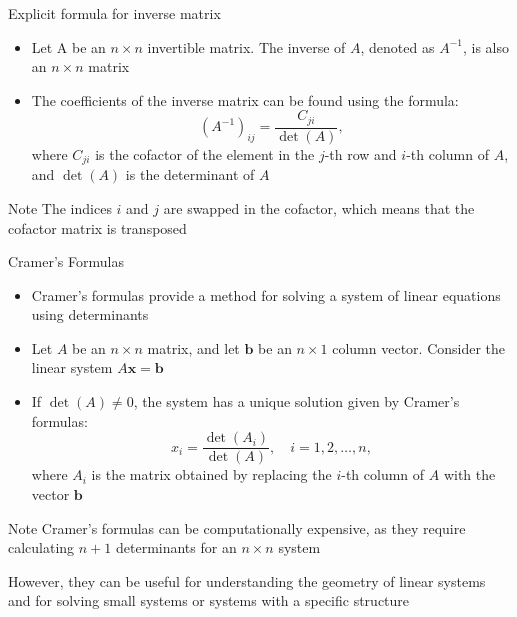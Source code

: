 \documentclass[fullscreen=true, bookmarks=true, hyperref={pdfencoding=unicode}]{beamer}
\begin{document}
\begin{frame}{Explicit formula for inverse matrix}
  \begin{itemize}
    \item Let A be an $n \times n$ invertible matrix. The inverse of $A$, 
    denoted as $A^{-1}$, is also an $n \times n$ matrix
    \item The coefficients of the inverse matrix can be found using the formula:
      \[
      (A^{-1})_{ij} = \frac{C_{ji}}{\det(A)},
      \]
      where $C_{ji}$ is the cofactor of the element in the $j$-th row 
      and $i$-th column of $A$, and $\det(A)$ is the determinant of $A$
  \end{itemize}

  \pause
  \begin{block}{Note}
    The indices $i$ and $j$ are swapped in the cofactor, 
    which means that the cofactor matrix is transposed
  \end{block}

\end{frame}


\begin{frame}{Cramer's Formulas}
  \begin{itemize}
    \item Cramer's formulas provide a method for 
    solving a system of linear equations using determinants
    \item Let $A$ be an $n \times n$ matrix, and 
    let $\textbf{b}$ be an $n \times 1$ column vector. 
    Consider the linear system $A\textbf{x} = \textbf{b}$
    \item If $\det(A) \neq 0$, the system has a unique solution given by Cramer's formulas:
      \[
      x_i = \frac{\det(A_i)}{\det(A)}, \quad i = 1, 2, \ldots, n,
      \]
      where $A_i$ is the matrix obtained by replacing the $i$-th column of $A$ 
      with the vector $\textbf{b}$
  \end{itemize}

  \pause
  \begin{block}{Note}
    \small
    Cramer's formulas can be computationally expensive, as they require 
    calculating $n + 1$ determinants for an $n \times n$ system
    
    However, they can be useful for understanding 
    the geometry of linear systems and for solving small systems 
    or systems with a specific structure
  \end{block}
\end{frame}
\end{document}
